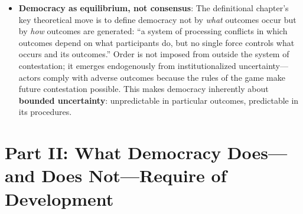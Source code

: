\documentclass[12pt]{article}
\begin{document}
\begin{itemize}[leftmargin=*, itemsep=4pt]
    \item \textbf{Democracy as equilibrium, not consensus}: The definitional chapter's key theoretical move is to define democracy not by \textit{what} outcomes occur but by \textit{how} outcomes are generated: ``a system of processing conflicts in which outcomes depend on what participants do, but no single force controls what occurs and its outcomes.'' Order is not imposed from outside the system of contestation; it emerges endogenously from institutionalized uncertainty---actors comply with adverse outcomes because the rules of the game make future contestation possible. This makes democracy inherently about \textbf{bounded uncertainty}: unpredictable in particular outcomes, predictable in its procedures.
\end{itemize}

\section{Part II: What Democracy Does---and Does Not---Require of Development}
\end{document}
